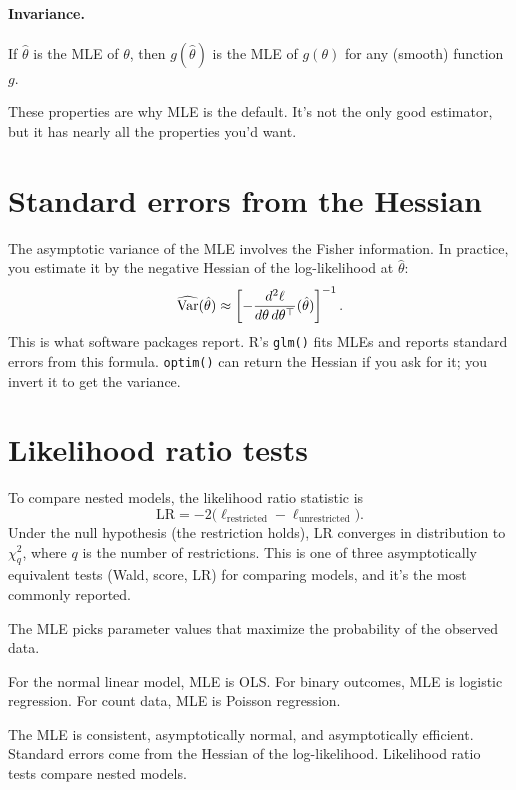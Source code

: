 \paragraph{Invariance.} If $\hat\theta$ is the MLE of $\theta$, then $g(\hat\theta)$ is the MLE of $g(\theta)$ for any (smooth) function $g$.

These properties are why MLE is the default. It's not the only good estimator, but it has nearly all the properties you'd want.

\section{Standard errors from the Hessian}

The asymptotic variance of the MLE involves the Fisher information. In practice, you estimate it by the negative Hessian of the log-likelihood at $\hat\theta$:
\[
  \widehat{\operatorname{Var}}(\hat\theta) \approx \left[-\frac{d^2 \ell}{d\theta\,d\theta^\top}(\hat\theta)\right]^{-1}.
\]
This is what software packages report. R's \texttt{glm()} fits MLEs and reports standard errors from this formula. \texttt{optim()} can return the Hessian if you ask for it; you invert it to get the variance.

\section{Likelihood ratio tests}

To compare nested models, the likelihood ratio statistic is
\begin{equation}
  \text{LR} = -2\bigl(\ell_{\text{restricted}} - \ell_{\text{unrestricted}}\bigr).
  \label{eq:lr-test}
\end{equation}
Under the null hypothesis (the restriction holds), LR converges in distribution to $\chi^2_q$, where $q$ is the number of restrictions. This is one of three asymptotically equivalent tests (Wald, score, LR) for comparing models, and it's the most commonly reported.

\begin{keyinsight}
The MLE picks parameter values that maximize the probability of the observed data.

For the normal linear model, MLE is OLS. For binary outcomes, MLE is logistic regression. For count data, MLE is Poisson regression.

The MLE is consistent, asymptotically normal, and asymptotically efficient. Standard errors come from the Hessian of the log-likelihood. Likelihood ratio tests compare nested models.
\end{keyinsight}

